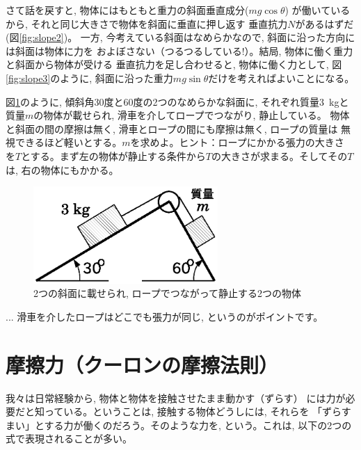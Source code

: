 さて話を戻すと, 物体にはもともと重力の斜面垂直成分($mg\cos\theta$)
が働いているから, それと同じ大きさで物体を斜面に垂直に押し返す
垂直抗力$N$があるはずだ(図\ref{fig:slope2})。
一方, 今考えている斜面はなめらかなので, 斜面に沿った方向には斜面は物体に力を
およぼさない（つるつるしている!）。結局, 物体に働く重力と斜面から物体が受ける
垂直抗力を足し合わせると, 物体に働く力として, 図\ref{fig:slope3}のように, 
斜面に沿った重力$mg \sin \theta$だけを考えればよいことになる。

%
\begin{q}\label{q:force_rope2}
図\ref{fig:slope4}のように, 傾斜角30度と60度の2つのなめらかな斜面に, 
それぞれ質量3~kgと質量$m$の物体が載せられ, 滑車を介してロープでつながり, 静止している。
物体と斜面の間の摩擦は無く, 滑車とロープの間にも摩擦は無く, ロープの質量は
無視できるほど軽いとする。$m$を求めよ。ヒント：ロープにかかる張力の大きさ
を$T$とする。まず左の物体が静止する条件から$T$の大きさが求まる。そしてその$T$は, 
右の物体にもかかる。
\begin{figure}[h]
    \centering
    \includegraphics[width=7cm]{slope4.eps}
    \caption{2つの斜面に載せられ, ロープでつながって静止する2つの物体}\label{fig:slope4}
\end{figure}
\end{q}\mv

\begin{faq}{\small{}
... 滑車を介したロープはどこでも張力が同じ, というのがポイントです。}\end{faq}
\hv



\section{摩擦力（クーロンの摩擦法則）}

我々は日常経験から, 物体と物体を接触させたまま動かす（ずらす）
には力が必要だと知っている。ということは, 接触する物体どうしには, それらを
「ずらすまい」とする力が働くのだろう。そのような力を, 
という。これは, 以下の2つの式で表現されることが多い。

